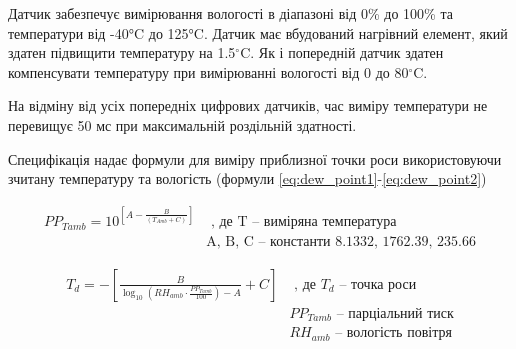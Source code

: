 Датчик забезпечує вимірювання вологості в діапазоні від 0\% до 100\% та температури від -40°C до 125°C. Датчик має вбудований нагрівний елемент, який здатен підвищити температуру на 1.5$^\circ$C. Як і попередній датчик здатен компенсувати температуру при вимірюванні вологості від 0 до 80$^\circ$C.

На відміну від усіх попередніх цифрових датчиків, час виміру температури не перевищує 50 мс при максимальній роздільній здатності.

Специфікація надає формули для виміру приблизної точки роси використовуючи зчитану температуру та вологість (формули \ref{eq:dew_point1}-\ref{eq:dew_point2})

\begin{equation}
    \begin{aligned}
        PP_{Tamb} = 10^{\left[A-\frac{B}{\left(T_{Amb}+C\right)}\right]}
        & \text{ , де T -- виміряна температура} \\
        & \text{A, B, C -- константи 8.1332, 1762.39, 235.66}
    \end{aligned}
    \label{eq:dew_point1}
\end{equation}

\begin{equation}
    \begin{aligned}
        T_d = -\left[\frac{B}{\log_{10} \left(RH_{amb}\cdot\frac{PP_{Tamb}}{100}\right)-A}+C\right]
        & \text{ , де $T_d$ -- точка роси} \\
        & PP_{Tamb} \text{ -- парціальний тиск} \\
        & RH_{amb} \text{ -- вологість повітря}
    \end{aligned}
    \label{eq:dew_point2}
\end{equation}
